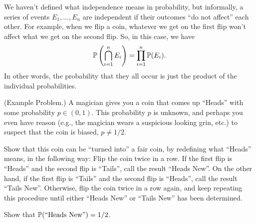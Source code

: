 \bigskip 

We haven't defined what independence means in probability, but informally, a series of events $E_1, \dots, E_n$ are independent if their outcomes ``do not affect'' each other. For example, when we flip a coin, whatever we get on the first flip won't affect what we get on the second flip. So, in this case, we have 
\[\mathbb{P}\left(\bigcap_{i = 1}^{n} E_i\right) = \prod_{i = 1}^{n} \mathbb{P}(E_i).\]
In other words, the probability that they all occur is just the product of the individual probabilities. 

\begin{mdframed}[]
    (Example Problem.) A magician gives you a coin that comes up ``Heads'' with some probability $p \in (0, 1)$. This probability $p$ is unknown, and perhaps you even have reason (e.g., the magician wears a suspicious looking grin, etc.) to suspect that the coin is biased, $p \neq 1/2$.

    \bigskip 

    \noindent
    Show that this coin can be ``turned into'' a fair coin, by redefining what ``Heads'' means, in the following way: Flip the coin twice in a row. If the first flip is ``Heads'' and the second flip is ``Tails'', call the result ``Heads New''. On the other hand, if the first flip is ``Tails'' and the second flip is ``Heads'', call the result ``Tails New''. Otherwise, flip the coin twice in a row again, and keep repeating this procedure until either ``Heads New'' or ``Tails New'' has been determined.

    \bigskip 

    \noindent
    Show that $\mathbb{P}(\text{``Heads New''}) = 1/2$.


\end{mdframed}
